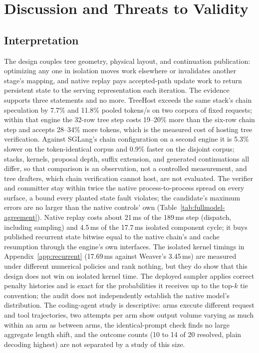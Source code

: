 \documentclass[sigconf,anonymous,review]{acmart}
\newcommand{\sys}{TreeHost}
\begin{document}
\section{Discussion and Threats to Validity}
\label{sec:discussion}
\subsection{Interpretation}
The design couples tree geometry, physical layout, and continuation publication: optimizing any one in isolation moves work elsewhere or invalidates another stage's mapping, and native replay pays accepted-path update work to return persistent state to the serving representation each iteration. The evidence supports three statements and no more. \sys{} exceeds the same stack's chain speculation by 7.7\% and 11.8\% pooled tokens/s on two corpora of fixed requests; within that engine the 32-row tree step costs 19--20\% more than the six-row chain step and accepts 28--34\% more tokens, which is the measured cost of hosting tree verification. Against SGLang's chain configuration on a second engine it is 5.3\% slower on the token-identical corpus and 0.9\% faster on the disjoint corpus; stacks, kernels, proposal depth, suffix extension, and generated continuations all differ, so that comparison is an observation, not a controlled measurement, and tree drafters, which chain verification cannot host, are not evaluated. The verifier and committer stay within twice the native process-to-process spread on every surface, a bound every planted state fault violates; the candidate's maximum errors are no larger than the native controls' own (Table~\ref{tab:fullmodel-agreement}). Native replay costs about 21\,ms of the 189\,ms step (dispatch, including sampling) and 4.5\,ms of the 17.7\,ms isolated component cycle; it buys published recurrent state bitwise equal to the native chain's and cache resumption through the engine's own interfaces. The isolated kernel timings in Appendix~\ref{app:recurrent} (17.69\,ms against Weaver's 3.45\,ms) are measured under different numerical policies and rank nothing, but they do show that this design does not win on isolated kernel time. The deployed sampler applies correct penalty histories and is exact for the probabilities it receives up to the top-$k$ tie convention; the audit does not independently establish the native model's distribution. The coding-agent study is descriptive: arms execute different request and tool trajectories, two attempts per arm show output volume varying as much within an arm as between arms, the identical-prompt check finds no large aggregate length shift, and the outcome counts (10 to 14 of 20 resolved, plain decoding highest) are not separated by a study of this size.
\end{document}
